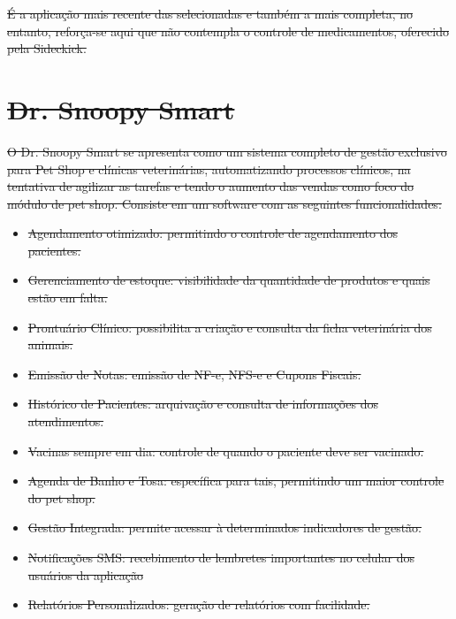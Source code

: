 \documentclass[
    12pt,               %
    openright,          %
    oneside,
    a4paper,            %
    BIBLATEX,           %
    TODO,               %
    english,            %
    brazil              %
    ]{ifsp-spo-inf-ctds}
\providecommand{\DIFdel}[1]{{\protect\color{red}\sout{#1}}}                      %
\begin{document}
\DIFdel{É a aplicação mais recente das selecionadas e também a mais completa, no entanto, reforça-se aqui que não contempla o controle de medicamentos, oferecido pela Sideckick.
}%

\section{\DIFdel{Dr. Snoopy Smart}}
\addtocounter{section}{-1}%
\DIFdel{O Dr. Snoopy Smart se apresenta como um sistema completo de gestão exclusivo para Pet Shop e clínicas veterinárias, automatizando processos clínicos, na tentativa de agilizar as tarefas e tendo o aumento das vendas como foco do módulo de pet shop. Consiste em um software com as seguintes funcionalidades:
}%

\begin{itemize}%
\item%
\DIFdel{Agendamento otimizado: permitindo o controle de agendamento dos pacientes.
    }%
\item%
\DIFdel{Gerenciamento de estoque: visibilidade da quantidade de produtos e quais estão em falta.
    }%
\item%
\DIFdel{Prontuário Clínico: possibilita a criação e consulta da ficha veterinária dos animais.
    }%
\item%
\DIFdel{Emissão de Notas: emissão de NF-e, NFS-e e Cupons Fiscais.
    }%
\item%
\DIFdel{Histórico de Pacientes: arquivação e consulta de informações dos atendimentos. 
    }%
\item%
\DIFdel{Vacinas sempre em dia: controle de quando o paciente deve ser vacinado.
    }%
\item%
\DIFdel{Agenda de Banho e Tosa: específica para tais, permitindo um maior controle do pet shop. }%
\item%
\DIFdel{Gestão Integrada: permite acessar à determinados indicadores de gestão.
    }%
\item%
\DIFdel{Notificações SMS: recebimento de lembretes importantes no celular dos usuários da aplicação
    }%
\item%
\DIFdel{Relatórios Personalizados: geração de relatórios com facilidade.
}
\end{itemize}%
\end{document}

